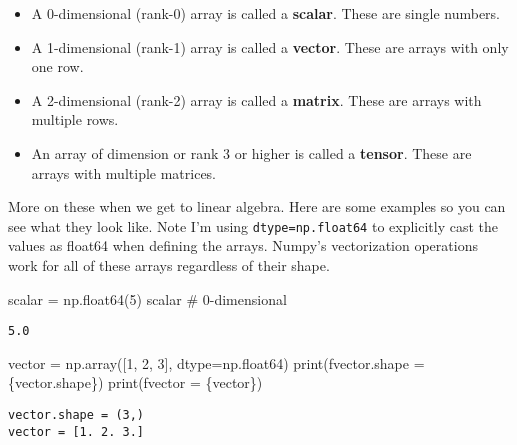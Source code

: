 \documentclass[
  letterpaper,
  DIV=11,
  numbers=noendperiod]{scrreprt}
\newenvironment{Shaded}{\begin{snugshade}}{\end{snugshade}}
\newcommand{\BuiltInTok}[1]{\textcolor[rgb]{0.00,0.23,0.31}{#1}}
\newcommand{\CommentTok}[1]{\textcolor[rgb]{0.37,0.37,0.37}{#1}}
\newcommand{\DecValTok}[1]{\textcolor[rgb]{0.68,0.00,0.00}{#1}}
\newcommand{\NormalTok}[1]{\textcolor[rgb]{0.00,0.23,0.31}{#1}}
\newcommand{\OperatorTok}[1]{\textcolor[rgb]{0.37,0.37,0.37}{#1}}
\newcommand{\SpecialCharTok}[1]{\textcolor[rgb]{0.37,0.37,0.37}{#1}}
\newcommand{\SpecialStringTok}[1]{\textcolor[rgb]{0.13,0.47,0.30}{#1}}
\providecommand{\tightlist}{%
  \setlength{\itemsep}{0pt}\setlength{\parskip}{0pt}}\usepackage{longtable,booktabs,array}
\begin{document}
\begin{itemize}
\tightlist
\item
  A 0-dimensional (rank-0) array is called a \textbf{scalar}. These are
  single numbers.
\item
  A 1-dimensional (rank-1) array is called a \textbf{vector}. These are
  arrays with only one row.
\item
  A 2-dimensional (rank-2) array is called a \textbf{matrix}. These are
  arrays with multiple rows.
\item
  An array of dimension or rank 3 or higher is called a \textbf{tensor}.
  These are arrays with multiple matrices.
\end{itemize}

More on these when we get to linear algebra. Here are some examples so
you can see what they look like. Note I'm using
\texttt{dtype=np.float64} to explicitly cast the values as float64 when
defining the arrays. Numpy's vectorization operations work for all of
these arrays regardless of their shape.

\begin{Shaded}
\begin{Highlighting}[]
\NormalTok{scalar }\OperatorTok{=}\NormalTok{ np.float64(}\DecValTok{5}\NormalTok{)}
\NormalTok{scalar }\CommentTok{\# 0{-}dimensional}
\end{Highlighting}
\end{Shaded}

\begin{verbatim}
5.0
\end{verbatim}

\begin{Shaded}
\begin{Highlighting}[]
\NormalTok{vector }\OperatorTok{=}\NormalTok{ np.array([}\DecValTok{1}\NormalTok{, }\DecValTok{2}\NormalTok{, }\DecValTok{3}\NormalTok{], dtype}\OperatorTok{=}\NormalTok{np.float64)}
\BuiltInTok{print}\NormalTok{(}\SpecialStringTok{f\textquotesingle{}vector.shape = }\SpecialCharTok{\{}\NormalTok{vector}\SpecialCharTok{.}\NormalTok{shape}\SpecialCharTok{\}}\SpecialStringTok{\textquotesingle{}}\NormalTok{)}
\BuiltInTok{print}\NormalTok{(}\SpecialStringTok{f\textquotesingle{}vector = }\SpecialCharTok{\{}\NormalTok{vector}\SpecialCharTok{\}}\SpecialStringTok{\textquotesingle{}}\NormalTok{)}
\end{Highlighting}
\end{Shaded}

\begin{verbatim}
vector.shape = (3,)
vector = [1. 2. 3.]
\end{verbatim}
\end{document}
